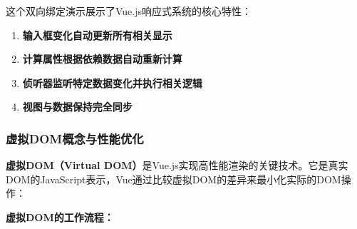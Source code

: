 \begin{Shaded}
\begin{Highlighting}[]
\OperatorTok{{-}}
  \OperatorTok{:} \OperatorTok{;}
\OperatorTok{{-}}\OperatorTok{:} \OperatorTok{;}
\OperatorTok{{-}}\OperatorTok{:} \OperatorTok{;}
  \OperatorTok{:}\OperatorTok{;}
\NormalTok{\}}
\OperatorTok{\textless{}/}\OperatorTok{\textgreater{}}
\end{Highlighting}
\end{Shaded}

这个双向绑定演示展示了Vue.js响应式系统的核心特性：

\begin{enumerate}
\def\labelenumi{\arabic{enumi}.}
\tightlist
\item
  \textbf{输入框变化自动更新所有相关显示}
\item
  \textbf{计算属性根据依赖数据自动重新计算}
\item
  \textbf{侦听器监听特定数据变化并执行相关逻辑}
\item
  \textbf{视图与数据保持完全同步}
\end{enumerate}

\subsubsection{虚拟DOM概念与性能优化}\label{ux865aux62dfdomux6982ux5ff5ux4e0eux6027ux80fdux4f18ux5316}

\textbf{虚拟DOM（Virtual DOM）}是Vue.js实现高性能渲染的关键技术。它是真实DOM的JavaScript表示，Vue通过比较虚拟DOM的差异来最小化实际的DOM操作：

\textbf{虚拟DOM的工作流程：}

